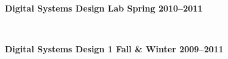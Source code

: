 \documentclass[10pt]{article} %
\begin{document}
\begin {minipage}[t]{0.2\linewidth}
\vspace{0pt}
\end {minipage}
\begin {minipage}[t]{0.8\linewidth}
\vspace{0pt}
\centerline {{\bf Digital Systems Design Lab \hfill Spring 2010--2011}}
 \\

\centerline {{\bf Digital Systems Design 1 \hfill Fall \& Winter 2009--2011}}
 \\
\end {minipage}

\begin {minipage}[t]{0.2\linewidth}
\vspace{0pt}
\end {minipage}
\end{document}

